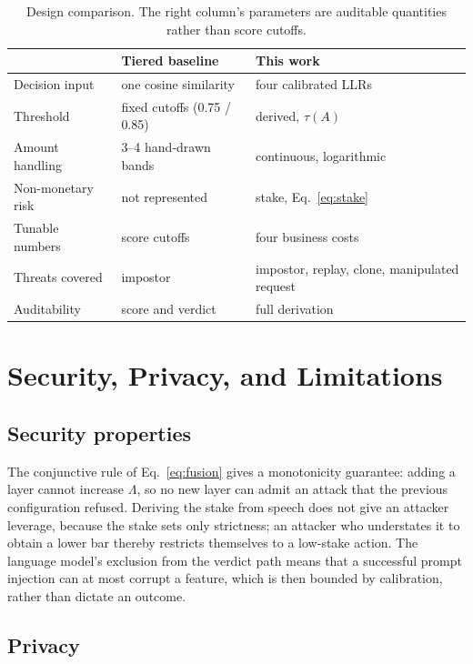 \documentclass[conference]{IEEEtran}
\begin{document}
\begin{table}[t]
\caption{Design comparison. The right column's parameters are auditable
quantities rather than score cutoffs.}
\label{tab:compare}
\centering
\footnotesize
\begin{tabular}{@{}p{1.7cm}p{2.5cm}p{2.9cm}@{}}
\toprule
 & \textbf{Tiered baseline} & \textbf{This work} \\
\midrule
Decision input & one cosine similarity & four calibrated LLRs \\
Threshold & fixed cutoffs (0.75 / 0.85) & derived, $\tau(A)$ \\
Amount handling & 3--4 hand-drawn bands & continuous, logarithmic \\
Non-monetary risk & not represented & stake, Eq.~\eqref{eq:stake} \\
Tunable numbers & score cutoffs & four business costs \\
Threats covered & impostor & impostor, replay, clone, manipulated request \\
Auditability & score and verdict & full derivation \\
\bottomrule
\end{tabular}
\end{table}

\section{Security, Privacy, and Limitations}

\subsection{Security properties}

The conjunctive rule of Eq.~\eqref{eq:fusion} gives a monotonicity guarantee:
adding a layer cannot increase $\Lambda$, so no new layer can admit an attack
that the previous configuration refused. Deriving the stake from speech does
not give an attacker leverage, because the stake sets only strictness; an
attacker who understates it to obtain a lower bar thereby restricts themselves
to a low-stake action. The language model's exclusion from the verdict path
means that a successful prompt injection can at most corrupt a feature, which
is then bounded by calibration, rather than dictate an outcome.

\subsection{Privacy}
\end{document}
